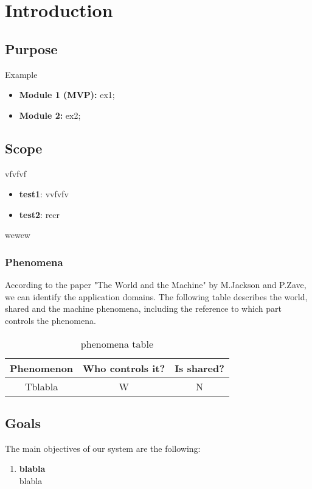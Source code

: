 \section{Introduction}

\subsection{Purpose}

Example
\begin{itemize}
    \item \textbf{Module 1 (MVP):} ex1;
    \item \textbf{Module 2:} ex2;
\end{itemize}

\subsection{Scope}
vfvfvf
\begin{itemize}
    \item {\textbf{test1}: vvfvfv}
    \item {\textbf{test2}: recr}
\end{itemize}

wewew

\subsubsection{Phenomena}
According to the paper "The World and the Machine" by M.Jackson and P.Zave, we can identify the application domains. The following table describes the world, shared and the machine phenomena, including the reference to which part controls the phenomena.
\begin{center}
    \begin{table}
        \begin{tabularx}{\textwidth}{| c| c| c|}
            \hline
            \rowcolor{blue!50}
            Phenomenon                                 & Who controls it? & Is shared? \\
            \hline
            Tblabla                    & W                & N          \\

            \hline
        \end{tabularx}
        \caption{phenomena table}
    \end{table}
\end{center}
\newpage
\subsection{Goals}
\label{goals}
The main objectives of our system are the following:
\begin{enumerate}[label=$\bullet$ \textbf{G\arabic*:}]
    \item \textbf{blabla}\\blabla
\end{enumerate}
